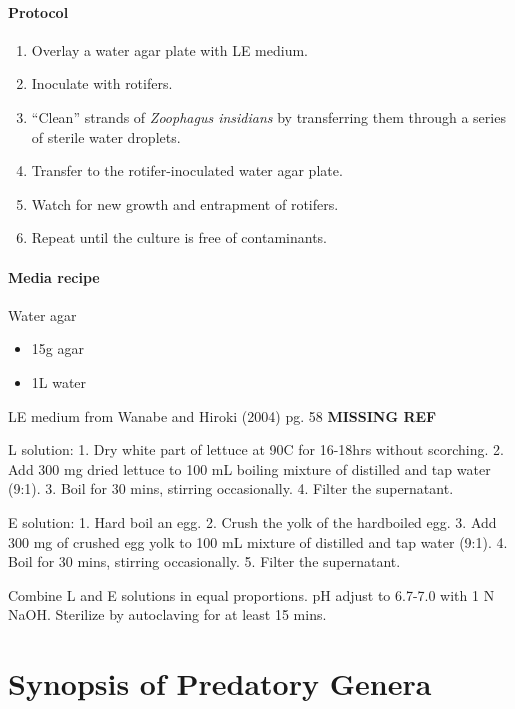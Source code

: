 \documentclass[]{book}
\providecommand{\tightlist}{%
  \setlength{\itemsep}{0pt}\setlength{\parskip}{0pt}}
\let\oldparagraph\paragraph
\renewcommand{\paragraph}[1]{\oldparagraph{#1}\mbox{}}
\begin{document}
\hypertarget{protocol-1}{%
\paragraph{Protocol}\label{protocol-1}}

\begin{enumerate}
\def\labelenumi{\arabic{enumi}.}
\tightlist
\item
  Overlay a water agar plate with LE medium.
\item
  Inoculate with rotifers.
\item
  ``Clean'' strands of \emph{Zoophagus insidians} by transferring them through a series of sterile water droplets.
\item
  Transfer to the rotifer-inoculated water agar plate.
\item
  Watch for new growth and entrapment of rotifers.
\item
  Repeat until the culture is free of contaminants.
\end{enumerate}

\hypertarget{media-recipe-1}{%
\paragraph{Media recipe}\label{media-recipe-1}}

{Water agar}

\begin{itemize}
\tightlist
\item
  15g agar
\item
  1L water
\end{itemize}

{LE medium from Wanabe and Hiroki (2004) pg. 58} \textbf{MISSING REF}

L solution:
1. Dry white part of lettuce at 90C for 16-18hrs without scorching.
2. Add 300 mg dried lettuce to 100 mL boiling mixture of distilled and tap water (9:1).
3. Boil for 30 mins, stirring occasionally.
4. Filter the supernatant.

E solution:
1. Hard boil an egg.
2. Crush the yolk of the hardboiled egg.
3. Add 300 mg of crushed egg yolk to 100 mL mixture of distilled and tap water (9:1).
4. Boil for 30 mins, stirring occasionally.
5. Filter the supernatant.

Combine L and E solutions in equal proportions. pH adjust to 6.7-7.0 with 1 N NaOH. Sterilize by autoclaving for at least 15 mins.

\hypertarget{synopsis-of-predatory-genera}{%
\section{Synopsis of Predatory Genera}\label{synopsis-of-predatory-genera}}
\end{document}
